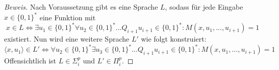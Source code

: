 \begin{proof}[Beweis]
    Nach Voraussetzung gibt es eine Sprache $L$, sodass für jede Eingabe $x \in \{0,1\}^*$ eine Funktion mit 
    $$
    x \in L \Leftrightarrow \exists u_1 \in \{0,1\}^* \forall u_2 \in \{0,1\}^* ... Q_{i+1}u_{i + 1} \in \{0,1\}^* : M(x, u_1, ..., u_{i+1}) = 1
    $$
    existiert.
    Nun wird eine weitere Sprache $L'$ wie folgt konstruiert:
    $$
    \langle x, u_1 \rangle \in L' \Leftrightarrow \forall u_2 \in \{0,1\}^* \exists u_3 \in \{0,1\}^* ... Q_{i+1}u_{i + 1} \in \{0,1\}^* : M(x, u_1, ..., u_{i+1}) = 1
    $$
    Offensichtlich ist $L \in \Sigma^p_i$ und $L' \in \Pi^p_i$.
\end{proof}